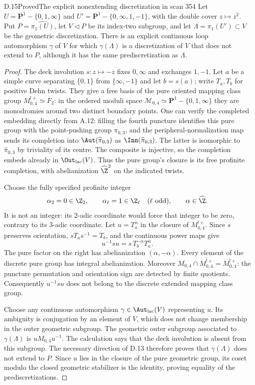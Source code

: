 \begin{claim}{D.15}{Proved}{The explicit nonextending discretization in scan 354}
Let $U=\mathbf P^1-\{0,1,\infty\}$ and
$U'=\mathbf P^1-\{0,\infty,1,-1\}$, with the double cover
$z\mapsto z^2$. Put $P=\widehat{\pi_1(U)}$, let $V\triangleleft P$ be its index-two subgroup, and let $\Lambda=\pi_1(U')\subset V$ be the geometric discretization. There is an explicit continuous loop automorphism $\gamma$ of $V$ for which $\gamma(\Lambda)$ is a discretization of $V$ that does not extend to $P$, although it has the same prediscretization as $\Lambda$.
\end{claim}
\begin{proof}
The deck involution $s:z\mapsto-z$ fixes $0,\infty$ and exchanges $1,-1$. Let $a$ be a simple curve separating $\{0,1\}$ from $\{\infty,-1\}$ and let $b=s(a)$; write $T_a,T_b$ for positive Dehn twists. They give a free basis of the pure oriented mapping class group $M^{!+}_{0,4}\simeq F_2$: in the ordered moduli space $\mathcal M_{0,4}\simeq\mathbf P^1-\{0,1,\infty\}$ they are monodromies around two distinct boundary points. One can verify the completed embedding directly from A.12: filling the fourth puncture identifies this pure group with the point-pushing group $\pi_{0,3}$, and the peripheral-normalization map sends its completion into $\Aut(\widehat\pi_{0,3})$ as $\Inn(\widehat\pi_{0,3})$. The latter is isomorphic to $\widehat\pi_{0,3}$ by triviality of its centre. The composite is injective, so the completion embeds already in $\Out_{\rm lac}(V)$. Thus the pure group's closure is its free profinite completion, with abelianization $\widehat\Z^2$ on the indicated twists.

Choose the fully specified profinite integer
\[
 \alpha_2=0\in\Z_2,\qquad
 \alpha_\ell=1\in\Z_\ell\quad(\ell\ {\rm odd}),
 \qquad \alpha\in\widehat\Z.
\]
It is not an integer: its $2$-adic coordinate would force that integer to be zero, contrary to its $3$-adic coordinate. Let $u=T_a^\alpha$ in the closure of $M^{!+}_{0,4}$. Since $s$ preserves orientation,
$sT_as^{-1}=T_b$, and the continuous power maps give
\[
 u^{-1}su=s\,T_b^{-\alpha}T_a^\alpha .
\]
The pure factor on the right has abelianization $(\alpha,-\alpha)$. Every element of the discrete pure group has integral abelianization. Moreover
$M_{0,4}\cap\overline{M^{!+}_{0,4}}=M^{!+}_{0,4}$: the puncture permutation and orientation sign are detected by finite quotients. Consequently $u^{-1}su$ does not belong to the discrete extended mapping class group.

Choose any continuous automorphism $\gamma\in\Aut_{\rm lac}(V)$ representing $u$. Its ambiguity is conjugation by an element of $V$, which does not change membership in the outer geometric subgroup. The geometric outer subgroup associated to $\gamma(\Lambda)$ is $uM_{0,4}u^{-1}$. The calculation says that the deck involution is absent from this subgroup. The necessary direction of D.13 therefore proves that $\gamma(\Lambda)$ does not extend to $P$. Since $u$ lies in the closure of the pure geometric group, its coset modulo the closed geometric stabilizer is the identity, proving equality of the prediscretizations.


\end{proof}
